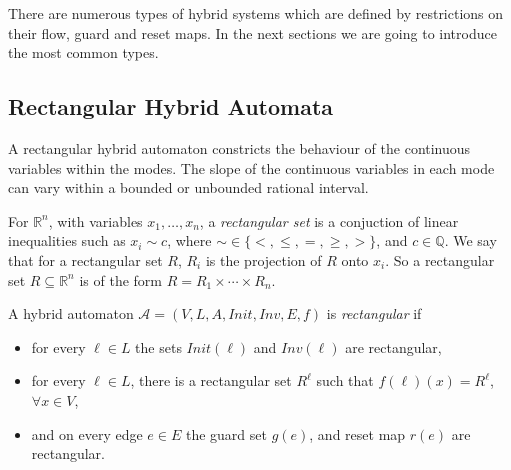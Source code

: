 There are numerous types of hybrid systems which are defined by restrictions on their flow, guard and reset maps. In the next sections we are going to introduce the most common types.


\subsection{Rectangular Hybrid Automata}
A rectangular hybrid automaton constricts the behaviour of the continuous variables within the modes. The slope of the continuous variables in each mode can vary within a bounded or unbounded rational interval.

\begin{defi}
For $\mathbb{R}^{n}$, with variables $x_{1},\ldots,x_{n}$, a \emph{rectangular set} is a conjuction of linear inequalities such as $x_{i}\sim c$, where $\sim\in\{<,\leq,=,\geq,>\}$, and $c\in\mathbb{Q}$. We say that for a rectangular set $R$, $R_{i}$ is the projection of $R$ onto $x_{i}$. So a rectangular set $R\subseteq\mathbb{R}^{n}$ is of the form $R=R_{1}\times\cdots\times R_{n}$.
\end{defi}

\begin{defi}
A hybrid automaton $\mathcal{A} = (V,L,A,Init,Inv,E,f)$ is \emph{rectangular} if
\begin{itemize}
    \item{for every $\ell\in L$ the sets $Init(\ell)$ and $Inv(\ell)$ are rectangular,}
    \item{for every $\ell\in L$, there is a rectangular set $R^{\ell}$ such that $f(\ell)(x)=R^{\ell}$, $\forall x \in V$,}
    \item{and on every edge $e\in E$ the guard set $g(e)$, and reset map $r(e)$ are rectangular.}
\end{itemize}
\end{defi}

